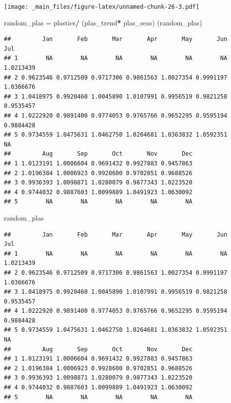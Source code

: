 \documentclass[]{book}
\newenvironment{Shaded}{\begin{snugshade}}{\end{snugshade}}
\newcommand{\NormalTok}[1]{#1}
\newcommand{\OperatorTok}[1]{\textcolor[rgb]{0.81,0.36,0.00}{\textbf{#1}}}
\newcommand{\StringTok}[1]{\textcolor[rgb]{0.31,0.60,0.02}{#1}}
\begin{document}
\texttt{[image: \_main\_files/figure-latex/unnamed-chunk-26-3.pdf]}

\begin{Shaded}
\begin{Highlighting}[]
\NormalTok{random_plas =}\StringTok{ }\NormalTok{plastics}\OperatorTok{/}\StringTok{ }\NormalTok{(plas_trend}\OperatorTok{*}\StringTok{ }\NormalTok{plas_seas)}
\NormalTok{(random_plas)}
\end{Highlighting}
\end{Shaded}

\begin{verbatim}
##         Jan       Feb       Mar       Apr       May       Jun       Jul
## 1        NA        NA        NA        NA        NA        NA 1.0213439
## 2 0.9623546 0.9712509 0.9717306 0.9861563 1.0027354 0.9991197 1.0366676
## 3 1.0418975 0.9920460 1.0045890 1.0107991 0.9956519 0.9821258 0.9535457
## 4 1.0222920 0.9891400 0.9774053 0.9765766 0.9652295 0.9595194 0.9884428
## 5 0.9734559 1.0475631 1.0462750 1.0264681 1.0363832 1.0592351        NA
##         Aug       Sep       Oct       Nov       Dec
## 1 1.0123191 1.0006604 0.9691432 0.9927883 0.9457863
## 2 1.0196384 1.0006923 0.9928600 0.9702851 0.9688526
## 3 0.9936393 1.0098871 1.0280079 0.9877343 1.0223520
## 4 0.9744032 0.9887603 1.0099889 1.0491923 1.0630092
## 5        NA        NA        NA        NA        NA
\end{verbatim}

\begin{Shaded}
\begin{Highlighting}[]
\NormalTok{random_plas}
\end{Highlighting}
\end{Shaded}

\begin{verbatim}
##         Jan       Feb       Mar       Apr       May       Jun       Jul
## 1        NA        NA        NA        NA        NA        NA 1.0213439
## 2 0.9623546 0.9712509 0.9717306 0.9861563 1.0027354 0.9991197 1.0366676
## 3 1.0418975 0.9920460 1.0045890 1.0107991 0.9956519 0.9821258 0.9535457
## 4 1.0222920 0.9891400 0.9774053 0.9765766 0.9652295 0.9595194 0.9884428
## 5 0.9734559 1.0475631 1.0462750 1.0264681 1.0363832 1.0592351        NA
##         Aug       Sep       Oct       Nov       Dec
## 1 1.0123191 1.0006604 0.9691432 0.9927883 0.9457863
## 2 1.0196384 1.0006923 0.9928600 0.9702851 0.9688526
## 3 0.9936393 1.0098871 1.0280079 0.9877343 1.0223520
## 4 0.9744032 0.9887603 1.0099889 1.0491923 1.0630092
## 5        NA        NA        NA        NA        NA
\end{verbatim}
\end{document}
